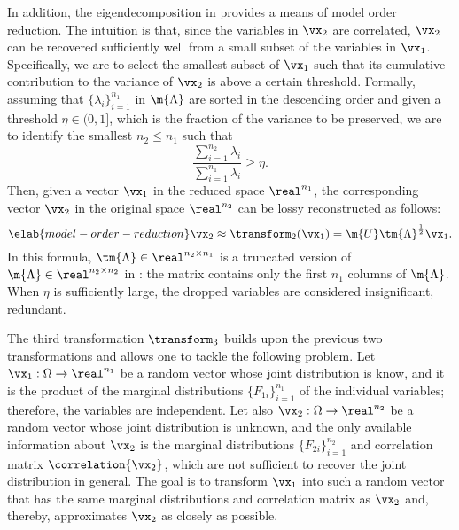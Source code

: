In addition, the eigendecomposition in  provides a
means of model order reduction. The intuition is that, since the variables in
$\vx_2$ are correlated, $\vx_2$ can be recovered sufficiently well from a small
subset of the variables in $\vx_1$. Specifically, we are to select the smallest
subset of $\vx_1$ such that its cumulative contribution to the variance of
$\vx_2$ is above a certain threshold. Formally, assuming that $\{ \lambda_i
\}_{i = 1}^{n_1}$ in $\m{\Lambda}$ are sorted in the descending order and given
a threshold $\eta \in (0, 1]$, which is the fraction of the variance to be
preserved, we are to identify the smallest $n_2 \leq n_1$ such that
\[
  \frac{\sum_{i = 1}^{n_2} \lambda_i}{\sum_{i = 1}^{n_1} \lambda_i} \geq \eta.
\]
Then, given a vector $\vx_1$ in the reduced space $\real^{n_1}$, the
corresponding vector $\vx_2$ in the original space $\real^{n_2}$ can be lossy
reconstructed as follows:
\begin{equation} \elab{model-order-reduction}
  \vx_2 \approx \transform_2(\vx_1) = \m{U} \tm{\Lambda}^\frac{1}{2} \vx_1.
\end{equation}
In this formula, $\tm{\Lambda} \in \real^{n_2 \times n_1}$ is a truncated
version of $\m{\Lambda} \in \real^{n_2 \times n_2}$ in
: the matrix contains only the first $n_1$ columns of
$\m{\Lambda}$. When $\eta$ is sufficiently large, the dropped variables are
considered insignificant, redundant.

The third transformation $\transform_3$ builds upon the previous two
transformations and allows one to tackle the following problem. Let $\vx_1:
\Omega \to \real^{n_1}$ be a random vector whose joint distribution is know, and
it is the product of the marginal distributions $\{ F_{1i} \}_{i = 1}^{n_1}$ of
the individual variables; therefore, the variables are independent. Let also
$\vx_2: \Omega \to \real^{n_2}$ be a random vector whose joint distribution is
unknown, and the only available information about $\vx_2$ is the marginal
distributions $\{ F_{2i} \}_{i = 1}^{n_2}$ and correlation matrix
$\correlation{\vx_2}$, which are not sufficient to recover the joint
distribution in general. The goal is to transform $\vx_1$ into such a random
vector that has the same marginal distributions and correlation matrix as
$\vx_2$ and, thereby, approximates $\vx_2$ as closely as possible.

